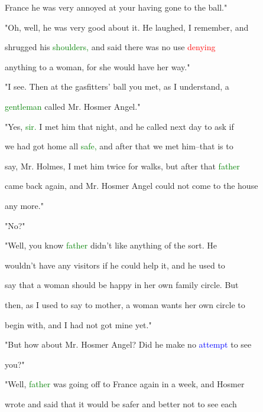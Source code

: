  France he was very annoyed at your having gone to the ball."



 "Oh, well, he was very \textcolor{BurntOrange}{good} about it. He \textcolor{BurntOrange}{laughed,} I remember, and

 shrugged his \textcolor{green}{shoulders,} and said there was no use \textcolor{red}{denying}

 anything to a woman, for she would have her way."



 "I see. Then at the gasfitters' ball you met, as I understand, a

 \textcolor{green}{gentleman} called Mr. Hosmer \textcolor{BurntOrange}{Angel."}



 "Yes, \textcolor{green}{sir.} I met him that night, and he called next day to ask if

 we had got home all \textcolor{green}{safe,} and after that we met him--that is to

 say, Mr. Holmes, I met him twice for walks, but after that \textcolor{green}{father}

 came back again, and Mr. Hosmer \textcolor{BurntOrange}{Angel} could not come to the house

 any more."



 "No?"



 "Well, you know \textcolor{green}{father} didn't like anything of the sort. He

 wouldn't have any \textcolor{BurntOrange}{visitors} if he could help it, and he used to

 say that a woman should be \textcolor{BurntOrange}{happy} in her own family circle. But

 then, as I used to say to \textcolor{BurntOrange}{mother,} a woman wants her own circle to

 begin with, and I had not got mine yet."



 "But how about Mr. Hosmer \textcolor{BurntOrange}{Angel?} Did he make no \textcolor{blue}{attempt} to see

 you?"



 "Well, \textcolor{green}{father} was going off to France again in a week, and Hosmer

 wrote and said that it would be safer and better not to see each

